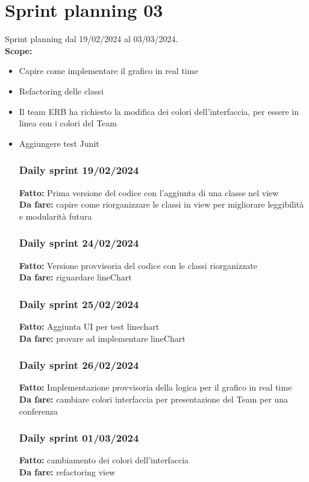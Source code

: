 \documentclass{report}
\begin{document}
\chapter{Sprint planning 03}
Sprint planning dal 19/02/2024 al 03/03/2024.\\

\textbf{Scope:}
\begin{itemize}
\item Capire come implementare il grafico in real time
\item Refactoring delle classi
\item Il team ERB ha richiesto la modifica dei colori dell'interfaccia, per essere in linea con i colori del Team 
\item Aggiungere test Junit


\subsection*{Daily sprint 19/02/2024}
\textbf{Fatto:} Prima versione del codice con l'aggiunta di una classe nel view\\
\textbf{Da fare:} capire come riorganizzare le classi in view per migliorare leggibilità e modularità futura
\subsection*{Daily sprint 24/02/2024}
\textbf{Fatto:} Versione provvisoria del codice con le classi riorganizzate\\
\textbf{Da fare:} riguardare lineChart
\subsection*{Daily sprint 25/02/2024}
\textbf{Fatto:} Aggiunta UI per test linechart\\
\textbf{Da fare:} provare ad implementare lineChart
\subsection*{Daily sprint 26/02/2024}
\textbf{Fatto:} Implementazione provvisoria della logica per il grafico in real time\\
\textbf{Da fare:} cambiare colori interfaccia per presentazione del Team per una conferenza
\subsection*{Daily sprint 01/03/2024}
\textbf{Fatto:} cambiamento dei colori dell'interfaccia \\
\textbf{Da fare:} refactoring view

\end{itemize}
\end{document}

